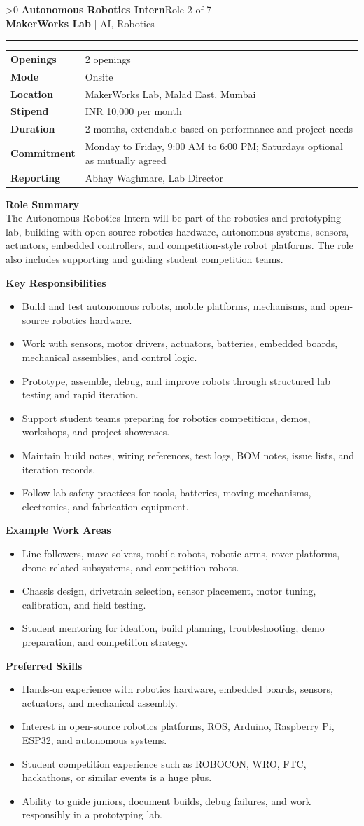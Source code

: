 \documentclass[10pt,a4paper]{article}
\newcommand{\CommonLocation}{MakerWorks Lab, Malad East, Mumbai}
\newcommand{\CommonStipend}{INR 10,000 per month}
\newcommand{\CommonDuration}{2 months, extendable based on performance and project needs}
\newcommand{\CommonCommitment}{Monday to Friday, 9:00 AM to 6:00 PM; Saturdays optional as mutually agreed}
\newcommand{\CommonReporting}{Abhay Waghmare, Lab Director}
\newcounter{rolepage}
\newcommand{\RolePage}[3]{%
  \ifnum\value{rolepage}>0\clearpage\fi
  \stepcounter{rolepage}
  \thispagestyle{plain}
  {\Large\textbf{#1}}\hfill{\small #2}\\
  {\small\textbf{MakerWorks Lab} | AI, Robotics}\\[4pt]
  \hrule
  \vspace{6pt}
  #3
}
\newcommand{\DetailsTable}[3]{%
\begin{tabularx}{\linewidth}{>{\bfseries}p{30mm}X}
Openings & #3 \\
Mode & #1 \\
Location & #2 \\
Stipend & \CommonStipend \\
Duration & \CommonDuration \\
Commitment & \CommonCommitment \\
Reporting & \CommonReporting \\
\end{tabularx}
}
\newcommand{\RoleSection}[1]{\vspace{5pt}\par\noindent\textbf{#1}\par\vspace{2pt}}
\begin{document}
\RolePage{Autonomous Robotics Intern}{Role 2 of 7}{
\DetailsTable{Onsite}{\CommonLocation}{2 openings}

\textbf{Role Summary}\\
The Autonomous Robotics Intern will be part of the robotics and prototyping lab, building with open-source robotics hardware, autonomous systems, sensors, actuators, embedded controllers, and competition-style robot platforms. The role also includes supporting and guiding student competition teams.

\RoleSection{Key Responsibilities}
\begin{itemize}
  \item Build and test autonomous robots, mobile platforms, mechanisms, and open-source robotics hardware.
  \item Work with sensors, motor drivers, actuators, batteries, embedded boards, mechanical assemblies, and control logic.
  \item Prototype, assemble, debug, and improve robots through structured lab testing and rapid iteration.
  \item Support student teams preparing for robotics competitions, demos, workshops, and project showcases.
  \item Maintain build notes, wiring references, test logs, BOM notes, issue lists, and iteration records.
  \item Follow lab safety practices for tools, batteries, moving mechanisms, electronics, and fabrication equipment.
\end{itemize}

\RoleSection{Example Work Areas}
\begin{itemize}
  \item Line followers, maze solvers, mobile robots, robotic arms, rover platforms, drone-related subsystems, and competition robots.
  \item Chassis design, drivetrain selection, sensor placement, motor tuning, calibration, and field testing.
  \item Student mentoring for ideation, build planning, troubleshooting, demo preparation, and competition strategy.
\end{itemize}

\RoleSection{Preferred Skills}
\begin{itemize}
  \item Hands-on experience with robotics hardware, embedded boards, sensors, actuators, and mechanical assembly.
  \item Interest in open-source robotics platforms, ROS, Arduino, Raspberry Pi, ESP32, and autonomous systems.
  \item Student competition experience such as ROBOCON, WRO, FTC, hackathons, or similar events is a huge plus.
  \item Ability to guide juniors, document builds, debug failures, and work responsibly in a prototyping lab.
\end{itemize}

}
\end{document}
